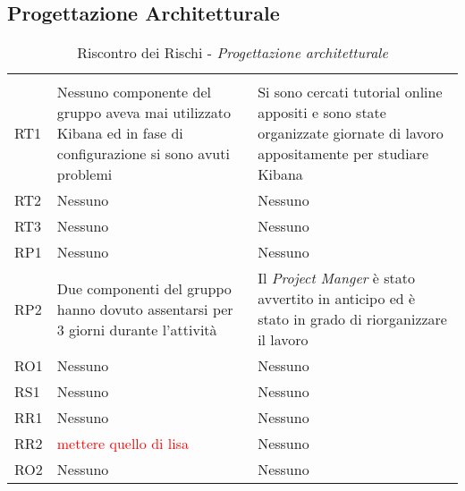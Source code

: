 \subsection{Progettazione Architetturale}
\begin{table}[H]
	\centering
	\begin{tabular}{|C{2.5cm}|C{5cm}|C{5cm}|}
		 & & \\
		RT1  & Nessuno componente del gruppo aveva mai utilizzato Kibana ed in fase di configurazione si sono avuti problemi & Si sono cercati tutorial online appositi e sono state organizzate giornate di lavoro appositamente per studiare Kibana \\
		\hline
		RT2  & Nessuno & Nessuno \\
		\hline
		RT3  & Nessuno & Nessuno \\
		\hline
		RP1  & Nessuno & Nessuno \\
		\hline
		RP2  & Due componenti del gruppo hanno dovuto assentarsi per 3 giorni durante l'attività & Il \textit{Project Manger} è stato avvertito in anticipo ed è stato in grado di riorganizzare il lavoro \\
		\hline
		RO1  & Nessuno & Nessuno \\
		\hline
		RS1  & Nessuno & Nessuno \\
		\hline
		RR1  & Nessuno & Nessuno \\
		\hline
		RR2  & \textcolor{red}{mettere quello di lisa} & Nessuno \\
		\hline
		RO2  & Nessuno & Nessuno \\
		\hline
	\end{tabular}
	\caption{Riscontro dei Rischi - \textit{Progettazione architetturale}}
\end{table}